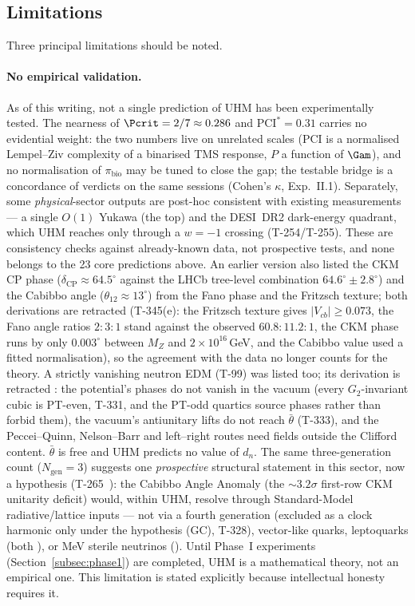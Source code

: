 \subsection{Limitations}

Three principal limitations should be noted.

\paragraph{No empirical validation.}
As of this writing, not a single prediction of UHM has been experimentally
tested. The nearness of $\Pcrit = 2/7 \approx 0.286$ and
$\mathrm{PCI}^* = 0.31$ carries no evidential weight: the two numbers live on
unrelated scales (PCI is a normalised Lempel--Ziv complexity of a binarised TMS
response, $P$ a function of $\Gam$), and no normalisation of $\pi_{\mathrm{bio}}$
may be tuned to close the gap; the testable bridge is a concordance of verdicts on
the same sessions (Cohen's $\kappa$, Exp.~II.1). Separately, some
\emph{physical}-sector outputs are post-hoc consistent with
existing measurements --- a single $O(1)$ Yukawa (the top) and the DESI~DR2 dark-energy
quadrant, which UHM reaches only through a $w=-1$ crossing (T-254/T-255). These
are consistency checks against already-known data, not prospective tests, and
none belongs to the 23 core predictions above. An earlier version also listed
the CKM CP phase ($\delta_{\mathrm{CP}} \approx 64.5^\circ$ against the LHCb
tree-level combination $64.6^\circ \pm 2.8^\circ$) and the Cabibbo angle
($\theta_{12} \approx 13^\circ$) from the Fano phase and the Fritzsch texture;
both derivations are retracted \status{$\times$} (T-345(e): the Fritzsch texture
gives $|V_{cb}| \geq 0.073$, the Fano angle ratios $2{:}3{:}1$ stand against the
observed $60.8{:}11.2{:}1$, the CKM phase runs by only $0.003^\circ$ between $M_Z$
and $2\times10^{16}$\,GeV, and the Cabibbo value used a fitted normalisation), so
the agreement with the data no longer counts for the theory. A strictly vanishing
neutron EDM (T-99) was listed too; its derivation is retracted \status{$\times$}: the
potential's phases do not vanish in the vacuum (every $G_2$-invariant cubic is
PT-even, T-331, and the PT-odd quartics source phases rather than forbid them),
the vacuum's antiunitary lifts do not reach $\bar\theta$ (T-333), and the
Peccei--Quinn, Nelson--Barr and left--right routes need fields outside the
Clifford content. $\bar\theta$ is free and UHM predicts no value of $d_n$.
The same three-generation count ($N_{\mathrm{gen}}=3$) suggests one
\emph{prospective} structural statement in this sector, now a hypothesis
(T-265~): the Cabibbo Angle Anomaly (the $\sim3.2\sigma$ first-row CKM
unitarity deficit) would, within UHM, resolve through Standard-Model
radiative/lattice inputs --- not via a fourth generation (excluded as a clock
harmonic only under the hypothesis (GC), T-328), vector-like quarks,
leptoquarks (both ), or MeV sterile neutrinos (). Until Phase~I experiments
(Section~\ref{subsec:phase1}) are completed, UHM is a mathematical theory,
not an empirical one. This limitation is stated explicitly because
intellectual honesty requires it.

